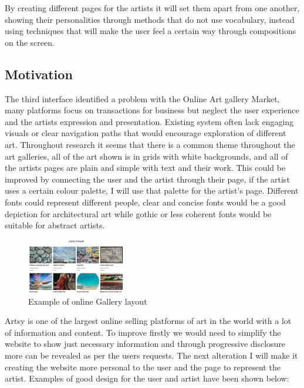 \documentclass[]{project_final}
\begin{document}
By creating different pages for the artists it will set them apart from one another, showing their personalities through methods that do not use vocabulary, instead using techniques that will make the user feel a certain way through compositions on the screen.
\subsection{Motivation}
The third interface identified a problem with the Online Art gallery Market, many platforms focus on transactions for business but neglect the user experience and the artists expression and presentation. Existing system often lack engaging visuals or clear navigation paths that would encourage exploration of different art.
Throughout research it seems that there is a common theme throughout the art galleries, all of the art shown is in grids with white backgrounds, and all of the artists pages are plain and simple with text and their work. This could be improved by connecting the user and the artist through their page, if the artist uses a certain colour palette, I will use that palette for the artist’s page. Different fonts could represent different people, clear and concise fonts would be a good depiction for architectural art while gothic or less coherent fonts would be suitable for abstract artists.

\begin{figure}[ht!]
    \centering
    \includegraphics[width=0.4\textwidth]{artGalleryGrid.png}
    \vspace*{0.0cm}
    \caption{Example of online Gallery layout}
    \label{fig:1}
\end{figure}

\newpage

Artsy is one of the largest online selling platforms of art in the world with a lot of information and content. To improve firstly we would need to simplify the website to show just necessary information and through progressive disclosure more can be revealed as per the users requests.
The next alteration I will make it creating the website more personal to the user and the page to represent the artist. Examples of good design for the user and artist have been shown below:
\end{document}
